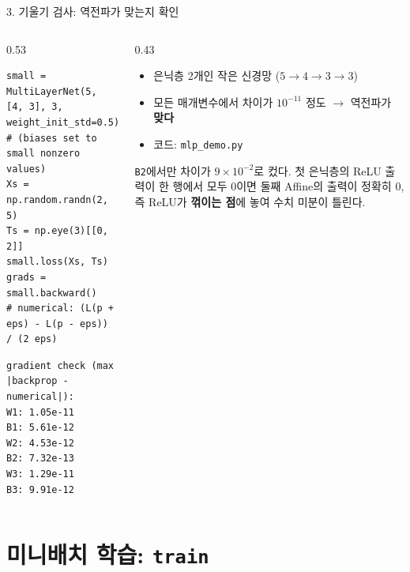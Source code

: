\documentclass[aspectratio=169,11pt]{beamer}
\newcommand{\code}[1]{\texttt{#1}}
\begin{document}
\begin{frame}[fragile]{3. 기울기 검사: 역전파가 맞는지 확인}
\begin{columns}[T,onlytextwidth]
\begin{column}{0.53\textwidth}
\begin{lstlisting}
small = MultiLayerNet(5, [4, 3], 3, weight_init_std=0.5)
# (biases set to small nonzero values)
Xs = np.random.randn(2, 5)
Ts = np.eye(3)[[0, 2]]
small.loss(Xs, Ts)
grads = small.backward()
# numerical: (L(p + eps) - L(p - eps)) / (2 eps)
\end{lstlisting}
\begin{lstlisting}[style=outstyle]
gradient check (max |backprop - numerical|):
W1: 1.05e-11
B1: 5.61e-12
W2: 4.53e-12
B2: 7.32e-13
W3: 1.29e-11
B3: 9.91e-12
\end{lstlisting}
\end{column}
\begin{column}{0.43\textwidth}
\small
\begin{itemize}
\item 은닉층 2개인 작은 신경망 ($5\to4\to3\to3$)
\item 모든 매개변수에서 차이가 $10^{-11}$ 정도 $\to$ 역전파가 \textbf{맞다}
\item 코드: \code{mlp\_demo.py}
\end{itemize}
\begin{thinkbox}[편향을 0으로 두면?]
\footnotesize
\code{B2}에서만 차이가 $9\times10^{-2}$로 컸다. 첫 은닉층의 ReLU 출력이 한 행에서 모두 $0$이면
둘째 Affine의 출력이 정확히 $0$, 즉 ReLU가 \textbf{꺾이는 점}에 놓여 수치 미분이 틀린다.
\end{thinkbox}
\end{column}
\end{columns}
\end{frame}

\section{미니배치 학습: \texttt{train}}
\end{document}

